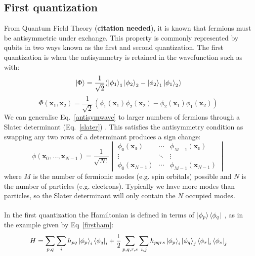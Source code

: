 \documentclass[twoside]{article}
\begin{document}
\subsection{First quantization}
From Quantum Field Theory (\textbf{citation needed}), it is known that fermions must be antisymmetric under exchange. This property is commonly represented by qubits in two ways known as the first and second quantization. The first quantization is when the antisymmetry is retained in the wavefunction such as with:
\begin{equation}\label{antisym}
        \ket{\Phi} = \frac{1}{\sqrt{2}}(\ket{\phi_1}_1 \ket{\phi_2}_2 - \ket{\phi_2}_1 \ket{\phi_1}_2)
\end{equation}
\begin{equation}\label{antisymwave}
        \Phi(\bm x_1, \bm x_2) = \frac{1}{\sqrt{2}}(\phi_1(\bm x_1) \phi_2(\bm x_2) - \phi_2(\bm x_1) \phi_1(\bm x_2))
\end{equation}
We can generalise Eq.~\ref{antisymwave} to larger numbers of fermions through a Slater determinant (Eq.~\ref{slater}) \cite{chemistryReview}. This satisfies the antisymmetry condition as swapping any two rows of a determinant produces a sign change:
\begin{equation}\label{slater}
        \phi(\bm x_0, ..., \bm x_{N-1}) = \frac{1}{\sqrt{N!}} 
        \begin{vmatrix} 
                \phi_0(\bm x_0) & \cdots & \phi_{M-1}(\bm x_0)\\
                \vdots & \ddots & \vdots \\
                \phi_0(\bm x_{N-1}) & \cdots & \phi_{M-1}(\bm x_{N-1})
        \end{vmatrix}
\end{equation}
where $M$ is the number of fermionic modes (e.g. spin orbitals) possible and $N$ is the number of particles (e.g. electrons). Typically we have more modes than particles, so the Slater determinant will only contain the $N$ occupied modes.\\\\ 
 In the first quantization the Hamiltonian is defined in terms of $\ket{\phi_p}\bra{\phi_q}$ \cite{tilly}, as in the example given by Eq~\ref{firstham}:
\begin{equation}
        \label{firstham}
        H = \sum_{p, q} \sum_i h_{pq}  \ket{\phi_p}_i \bra{\phi_q}_i + \frac{1}{2} \sum_{p,q,r,s}\sum_{i,j} h_{pqrs} \ket{\phi_p}_i \ket{\phi_q}_j \bra{\phi_r}_i \bra{\phi_s}_j
\end{equation}
\end{document}
